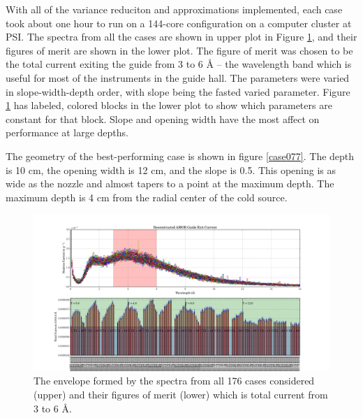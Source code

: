 \documentclass[a4paper]{jpconf}
\begin{document}
With all of the variance reduciton and approximations implemented, each case took about one hour to run on a 144-core configuration on a computer cluster at PSI.  The spectra from all the cases are shown in upper plot in Figure \ref{parametric_REH}, and their figures of merit are shown in the lower plot.  The figure of merit was chosen to be the total current exiting the guide from 3 to 6 \AA{} -- the wavelength band which is useful for most of the instruments in the guide hall.  The parameters were varied in slope-width-depth order, with slope being the fasted varied parameter. Figure \ref{parametric_REH} has labeled, colored blocks in the lower plot to show which parameters are constant for that block.  Slope and opening width have the most affect on performance at large depths.

The geometry of the best-performing case is shown in figure \ref{case077}.  The depth is 10 cm, the opening width is 12 cm, and the slope is 0.5.  This opening is as wide as the nozzle and almost tapers to a point at the maximum depth.  The maximum depth is 4 cm from the radial center of the cold source.  

\begin{figure}
\begin{center}
\includegraphics[scale=0.38,trim={1cm 2.35cm 1cm 0cm},clip]{graphics/parametric_REH.pdf}
\end{center}
\caption{\label{parametric_REH}The envelope formed by the spectra from all 176 cases considered (upper) and their figures of merit (lower) which is total current from 3 to 6 \AA{}.}
\end{figure}
\end{document}
